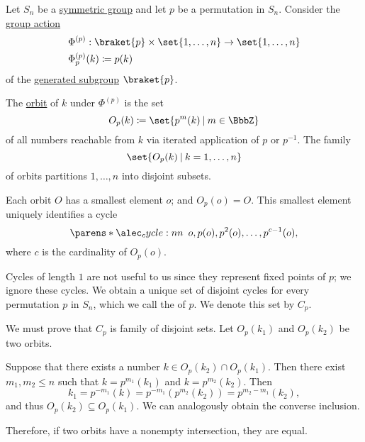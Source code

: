 \begin{definition}\label{def:permutation_cycle_decomposition}\mimprovised
  Let \( S_n \) be a \hyperref[def:symmetric_group]{symmetric group} and let \( p \) be a permutation in \( S_n \). Consider the \hyperref[def:group_action]{group action}
  \begin{equation*}
    \begin{aligned}
      &\Phi^{(p)}: \braket{ p } \times \set{ 1, \ldots, n } \to \set{ 1, \ldots, n } \\
      &\Phi^{(p)}_p(k) \coloneqq p(k)
    \end{aligned}
  \end{equation*}
  of the \hyperref[def:first_order_generated_substructure]{generated subgroup} \( \braket{ p } \).

  The \hyperref[def:group_action_orbit]{orbit} of \( k \) under \( \Phi^{(p)} \) is the set
  \begin{equation*}
    O_p(k) \coloneqq \set{ p^m(k) \given m \in \BbbZ }
  \end{equation*}
  of all numbers reachable from \( k \) via iterated application of \( p \) or \( p^{-1} \). The family
  \begin{equation*}
    \set{ O_p(k) \given k = 1, \ldots, n }
  \end{equation*}
  of orbits partitions \( 1, \ldots, n \) into disjoint subsets.

  Each orbit \( O \) has a smallest element \( o \); and \( O_p(o) = O \). This smallest element uniquely identifies a cycle
  \begin{equation*}
    \cycle{o, p(o), p^2(o), \ldots, p^{c-1}(o)},
  \end{equation*}
  where \( c \) is the cardinality of \( O_p(o) \).

  Cycles of length \( 1 \) are not useful to us since they represent fixed points of \( p \); we ignore these cycles. We obtain a unique set of disjoint cycles for every permutation \( p \) in \( S_n \), which we call the  of \( p \). We denote this set by \( C_p \).
\end{definition}
\begin{defproof}
  We must prove that \( C_p \) is family of disjoint sets. Let \( O_p(k_1) \) and \( O_p(k_2) \) be two orbits.

  Suppose that there exists a number \( k \in O_p(k_2) \cap O_p(k_1) \). Then there exist \( m_1, m_2 \leq n \) such that \( k = p^{m_1}(k_1) \) and \( k = p^{m_2}(k_2) \). Then
  \begin{equation*}
    k_1 = p^{-m_1}(k) = p^{-m_1}(p^{m_2}(k_2)) = p^{m_2 - m_1}(k_2),
  \end{equation*}
  and thus \( O_p(k_2) \subseteq O_p(k_1) \). We can analogously obtain the converse inclusion.

  Therefore, if two orbits have a nonempty intersection, they are equal.
\end{defproof}

